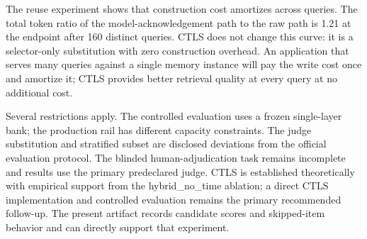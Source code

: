 The reuse experiment shows that construction cost amortizes across queries. The total token ratio of the model-acknowledgement path to the raw path is 1.21 at the endpoint after 160 distinct queries. CTLS does not change this curve: it is a selector-only substitution with zero construction overhead. An application that serves many queries against a single memory instance will pay the write cost once and amortize it; CTLS provides better retrieval quality at every query at no additional cost.

Several restrictions apply. The controlled evaluation uses a frozen single-layer bank; the production rail has different capacity constraints. The judge substitution and stratified subset are disclosed deviations from the official evaluation protocol. The blinded human-adjudication task remains incomplete and results use the primary predeclared judge. CTLS is established theoretically with empirical support from the hybrid\_no\_time ablation; a direct CTLS implementation and controlled evaluation remains the primary recommended follow-up. The present artifact records candidate scores and skipped-item behavior and can directly support that experiment.

